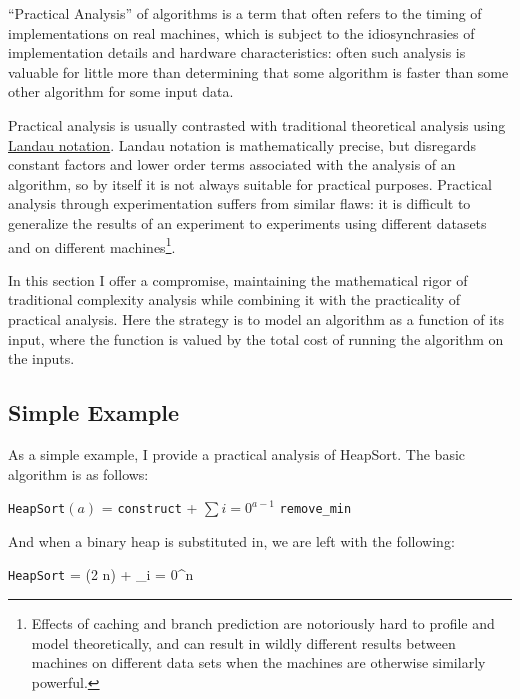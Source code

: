 ``Practical Analysis'' of algorithms is a term that often refers to the timing of implementations on real machines, which is subject to the idiosynchrasies of implementation details and hardware characteristics: often such analysis is valuable for little more than determining that some algorithm is faster than some other algorithm for some input data.  

Practical analysis is usually contrasted with traditional theoretical analysis using \href{http://en.wikipedia.org/wiki/Big_O_notation}{Landau notation}.  Landau notation is mathematically precise, but disregards constant factors and lower order terms associated with the analysis of an algorithm, so by itself it is not always suitable for practical purposes.  Practical analysis through experimentation suffers from similar flaws: it is difficult to generalize the results of an experiment to experiments using different datasets and on different machines\footnote{Effects of caching and branch prediction are notoriously hard to profile and model theoretically, and can result in wildly different results between machines on different data sets when the machines are otherwise similarly powerful.}.  

In this section I offer a compromise, maintaining the mathematical rigor of traditional complexity analysis while combining it with the practicality of practical analysis.  Here the strategy is to model an algorithm as a function of its input, where the function is valued by the total cost of running the algorithm on the inputs.

\subsection{Simple Example}

As a simple example, I provide a practical analysis of HeapSort.  The basic algorithm is as follows:

\par
\bigskip

\texttt{HeapSort}$(a)$ = \texttt{construct} + $\sum{i = 0}^{a-1}$ \texttt{remove_min}

\par
\bigskip

And when a binary heap is substituted in, we are left with the following:

\par
\bigskip

\texttt{HeapSort} = (2 \cdot n) + \sum_{i = 0}^n 

